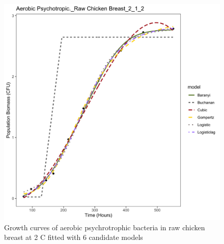 \documentclass[a4paper,11pt]{article}
\theoremstyle{definition}
\begin{document}
\begin{linenumbers}
\begin{center}
\begin{figure}[!ht]
\begin{center}
                    \includegraphics[width=\linewidth]{../results/example.png}
                     \caption{Growth curves of aerobic psychrotrophic bacteria in raw chicken breast at 2 \textdegree C fitted with 6 candidate models}
                \end{center}
        \end{figure}
\end{center}

\end{linenumbers}
\end{document}
